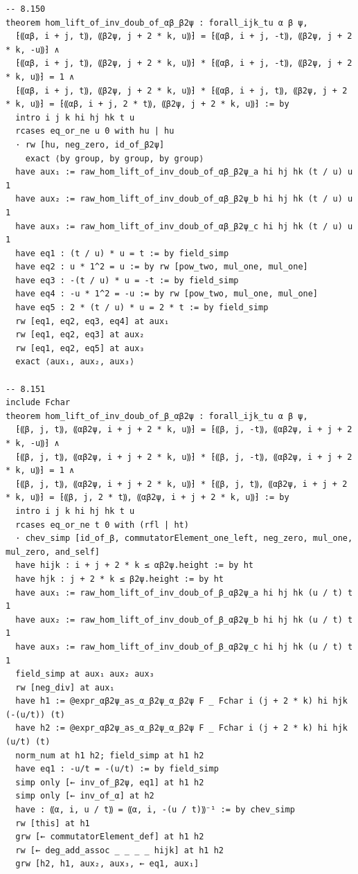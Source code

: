 \documentclass[10pt,a4paper]{article}
\begin{document}
\begin{Verbatim}
-- 8.150
theorem hom_lift_of_inv_doub_of_αβ_β2ψ : forall_ijk_tu α β ψ,
  ⁅⸨αβ, i + j, t⸩, ⸨β2ψ, j + 2 * k, u⸩⁆ = ⁅⸨αβ, i + j, -t⸩, ⸨β2ψ, j + 2 * k, -u⸩⁆ ∧
  ⁅⸨αβ, i + j, t⸩, ⸨β2ψ, j + 2 * k, u⸩⁆ * ⁅⸨αβ, i + j, -t⸩, ⸨β2ψ, j + 2 * k, u⸩⁆ = 1 ∧
  ⁅⸨αβ, i + j, t⸩, ⸨β2ψ, j + 2 * k, u⸩⁆ * ⁅⸨αβ, i + j, t⸩, ⸨β2ψ, j + 2 * k, u⸩⁆ = ⁅⸨αβ, i + j, 2 * t⸩, ⸨β2ψ, j + 2 * k, u⸩⁆ := by
  intro i j k hi hj hk t u
  rcases eq_or_ne u 0 with hu | hu
  · rw [hu, neg_zero, id_of_β2ψ]
    exact ⟨by group, by group, by group⟩
  have aux₁ := raw_hom_lift_of_inv_doub_of_αβ_β2ψ_a hi hj hk (t / u) u 1
  have aux₂ := raw_hom_lift_of_inv_doub_of_αβ_β2ψ_b hi hj hk (t / u) u 1
  have aux₃ := raw_hom_lift_of_inv_doub_of_αβ_β2ψ_c hi hj hk (t / u) u 1
  have eq1 : (t / u) * u = t := by field_simp
  have eq2 : u * 1^2 = u := by rw [pow_two, mul_one, mul_one]
  have eq3 : -(t / u) * u = -t := by field_simp
  have eq4 : -u * 1^2 = -u := by rw [pow_two, mul_one, mul_one]
  have eq5 : 2 * (t / u) * u = 2 * t := by field_simp
  rw [eq1, eq2, eq3, eq4] at aux₁
  rw [eq1, eq2, eq3] at aux₂
  rw [eq1, eq2, eq5] at aux₃
  exact ⟨aux₁, aux₂, aux₃⟩

-- 8.151
include Fchar
theorem hom_lift_of_inv_doub_of_β_αβ2ψ : forall_ijk_tu α β ψ,
  ⁅⸨β, j, t⸩, ⸨αβ2ψ, i + j + 2 * k, u⸩⁆ = ⁅⸨β, j, -t⸩, ⸨αβ2ψ, i + j + 2 * k, -u⸩⁆ ∧
  ⁅⸨β, j, t⸩, ⸨αβ2ψ, i + j + 2 * k, u⸩⁆ * ⁅⸨β, j, -t⸩, ⸨αβ2ψ, i + j + 2 * k, u⸩⁆ = 1 ∧
  ⁅⸨β, j, t⸩, ⸨αβ2ψ, i + j + 2 * k, u⸩⁆ * ⁅⸨β, j, t⸩, ⸨αβ2ψ, i + j + 2 * k, u⸩⁆ = ⁅⸨β, j, 2 * t⸩, ⸨αβ2ψ, i + j + 2 * k, u⸩⁆ := by
  intro i j k hi hj hk t u
  rcases eq_or_ne t 0 with (rfl | ht)
  · chev_simp [id_of_β, commutatorElement_one_left, neg_zero, mul_one, mul_zero, and_self]
  have hijk : i + j + 2 * k ≤ αβ2ψ.height := by ht
  have hjk : j + 2 * k ≤ β2ψ.height := by ht
  have aux₁ := raw_hom_lift_of_inv_doub_of_β_αβ2ψ_a hi hj hk (u / t) t 1
  have aux₂ := raw_hom_lift_of_inv_doub_of_β_αβ2ψ_b hi hj hk (u / t) t 1
  have aux₃ := raw_hom_lift_of_inv_doub_of_β_αβ2ψ_c hi hj hk (u / t) t 1
  field_simp at aux₁ aux₂ aux₃
  rw [neg_div] at aux₁
  have h1 := @expr_αβ2ψ_as_α_β2ψ_α_β2ψ F _ Fchar i (j + 2 * k) hi hjk (-(u/t)) (t)
  have h2 := @expr_αβ2ψ_as_α_β2ψ_α_β2ψ F _ Fchar i (j + 2 * k) hi hjk (u/t) (t)
  norm_num at h1 h2; field_simp at h1 h2
  have eq1 : -u/t = -(u/t) := by field_simp
  simp only [← inv_of_β2ψ, eq1] at h1 h2
  simp only [← inv_of_α] at h2
  have : ⸨α, i, u / t⸩ = ⸨α, i, -(u / t)⸩⁻¹ := by chev_simp
  rw [this] at h1
  grw [← commutatorElement_def] at h1 h2
  rw [← deg_add_assoc _ _ _ _ hijk] at h1 h2
  grw [h2, h1, aux₂, aux₃, ← eq1, aux₁]


\end{Verbatim}
\end{document}

